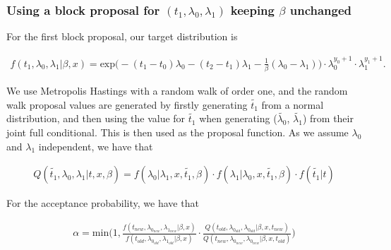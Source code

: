 \subsubsection{Using a block proposal for $(t_1, \lambda_0, \lambda_1)$ keeping $\beta$ unchanged}


For the first block proposal, our target distribution is

\begin{align}
    f(t_1, \lambda_0, \lambda_1|\beta, x) = \text{exp} \Big( -(t_1-t_0)\lambda_0 -(t_2-t_1)\lambda_1 - \frac{1}{\beta}(\lambda_0 - \lambda_1)\Big) \cdot\lambda_0^{y_0 + 1} \cdot \lambda_1^{y_1 + 1}.
\end{align}

We use Metropolis Hastings with a random walk of order one, and the random walk proposal values are generated by firstly generating $\widetilde{t_1}$ from a normal distribution, and then using the value for $\widetilde{t_1}$ when generating ($\widetilde{\lambda_0}$, $\widetilde{\lambda_1}$) from their joint full conditional. This is then used as the proposal function. As we assume $\lambda_0$ and $\lambda_1$ independent, we have that 

\begin{align}
    Q(\widetilde{t_1}, \lambda_0, \lambda_1 |t, x, \beta) = f(\lambda_0| \lambda_1, x, \widetilde{t_1}, \beta)\cdot f(\lambda_1| \lambda_0, x, \widetilde{t_1}, \beta)\cdot f(\widetilde{t_1}| t) 
\end{align}

For the acceptance probability, we have that

\begin{align}
    \alpha = \text{min} \Bigg(1,  \frac{
    f(t_{new}, \lambda_{0_{new}}, \lambda_{1_{new}}|\beta, x)}{f(t_{old}, \lambda_{0_{old}}, \lambda_{1_{old}}|\beta, x)}
    \cdot 
    \frac{Q(t_{old}, \lambda_{0_{old}}, \lambda_{0_{old}} | \beta, x, t_{new})}{Q(t_{new}, \lambda_{0_{new}}, \lambda_{0_{new}} | \beta, x, t_{old})} \Bigg) 
\end{align}




